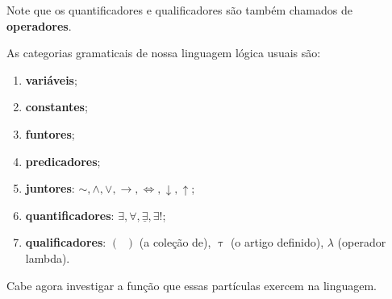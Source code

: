 Note que os quantificadores e qualificadores são também chamados de \textbf{operadores}.

As categorias gramaticais de nossa linguagem lógica usuais são:

\begin{enumerate}
    \item \textbf{variáveis};
    \item \textbf{constantes};
    \item \textbf{funtores};
    \item \textbf{predicadores};
    \item \textbf{juntores}: $\sim, \land, \lor, \to, \iff, \downarrow, \uparrow$;
    \item \textbf{quantificadores}: $\exists, \forall, \underline{\exists}, \exists!$;
    \item \textbf{qualificadores}: $(\;\;)$ (a coleção de), $\uptau$ (o artigo definido), $\lambda$ (operador lambda).
\end{enumerate}

Cabe agora investigar a função que essas partículas exercem na linguagem.

